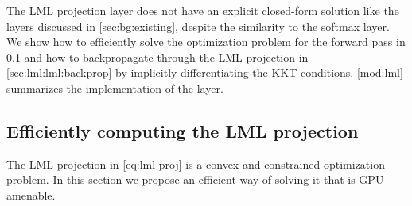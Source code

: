 The LML projection layer does not have an explicit closed-form
solution like the layers discussed in \cref{sec:bg:existing},
despite the similarity to the softmax layer.
We show how to efficiently solve the optimization problem
for the forward pass in \cref{sec:lml:lml:efficient}
and how to backpropagate through the LML projection in
\cref{sec:lml:lml:backprop} by implicitly differentiating
the KKT conditions.
\cref{mod:lml} summarizes the
implementation of the layer.


\newpage
\subsection{Efficiently computing the LML projection}
\label{sec:lml:lml:efficient}
The LML projection in \cref{eq:lml-proj} is a convex and
constrained optimization problem. In this section we
propose an efficient way of solving it that is GPU-amenable.

